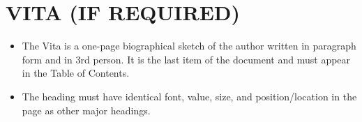 \chapter*{VITA (IF REQUIRED)}

\begin{itemize}
\item
The Vita is a one-page biographical sketch of the author written in paragraph
form and in 3rd person. It is the last item of the document and must appear in the
Table of Contents.
\item
The heading must have identical font, value, size, and position/location in the
page as other major headings.
\end{itemize}

